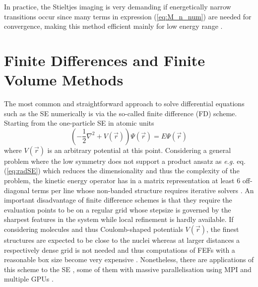 In practice, the Stieltjes imaging is very demanding if energetically narrow transitions occur since many terms in expression (\ref{eq:M_n_num}) are needed for convergence, making this method efficient mainly for low energy range \cite{H2pDeCleva}.

\section{Finite Differences and Finite Volume Methods}
\label{ch:FD}
The most common and straightforward approach to solve differential equations such as the SE numerically is via the so-called finite difference (FD) scheme.
Starting from the one-particle SE in atomic units
\begin{equation} 
\left(-\frac 12 \nabla^2 + V(\vec{r}) \right) \Psi(\vec{r})=E\Psi(\vec{r})
\end{equation}
where $V(\vec{r})$ is an arbitrary potential at this point.
Considering a general problem where the low symmetry does not support a product ansatz as \textit{e.g.} eq. (\ref{eq:radSE}) which reduces the dimensionality and thus the complexity of the problem, the kinetic energy operator has in a matrix representation at least $6$ off-diagonal terms per line whose non-banded structure requires iterative solvers \cite{fd_Cart}.
An important disadvantage of finite difference schemes is that they require the evaluation points to be on a regular grid whose stepsize is governed by the sharpest features in the system while local refinement is hardly available.
If considering molecules and thus Coulomb-shaped potentials $V(\vec{r})$, the finest structures are expected to be close to the nuclei whereas at larger distances a respectively dense grid is not needed and thus computations of FEFs with a reasonable box size become very expensive \cite{richardsFD}.
Nonetheless, there are applications of this scheme to the SE \cite{fd_Cart,fd_Cart2}, some of them with massive parallelisation using MPI and multiple GPUs \cite{fd_gpu}.

